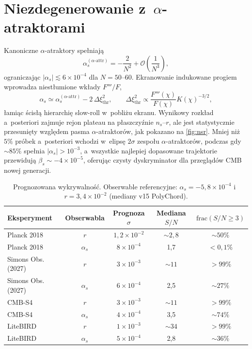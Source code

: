 \documentclass[11pt,a4paper]{article}
\begin{document}
\section{Niezdegenerowanie z~$\alpha$-atraktorami}
\label{sec:nondegeneracy}
Kanoniczne $\alpha$-atraktory spełniają
\begin{equation}
\alpha_{s}^{(\alpha\text{-attr})}=-\frac{2}{N^{2}}+\mathcal{O}\left(\frac{1}{N^{3}}\right),
\end{equation}
ograniczając $|\alpha_{s}|\lesssim6\times10^{-4}$ dla $N=50$--60. Ekranowanie indukowane progiem wprowadza niestłumione wkłady $F'''/F$,
\begin{equation}
\alpha_{s}\simeq \alpha_{s}^{(\alpha\text{-attr})}-2\,\Delta\xi_{\text{thr}}^{2}, \qquad \Delta\xi_{\text{thr}}^{2}\propto\frac{F'''(\chi)}{F(\chi)}K(\chi)^{-3/2},
\end{equation}
łamiąc ścisłą hierarchię slow-roll w~pobliżu ekranu. Wynikowy rozkład a~posteriori zajmuje rejon plateau na płaszczyźnie $n_{s}$--$r$, ale jest statystycznie przesunięty względem pasma $\alpha$-atraktorów, jak pokazano na \cref{fig:nsr}. Mniej niż $5\%$ próbek a~posteriori wchodzi w~elipsę $2\sigma$ zespołu $\alpha$-atraktorów, podczas gdy ${\sim}85\%$ spełnia $|\alpha_{s}|>10^{-3}$, a~wszystkie najlepiej dopasowane trajektorie przewidują $\beta_{s}\sim -4\times10^{-5}$, oferując czysty dyskryminator dla przeglądów CMB nowej generacji.

\begin{table}[t]
    \centering
    \caption{Prognozowana wykrywalność. Obserwable referencyjne: $\alpha_{s}=-5{,}8\times10^{-4}$ i~$r=3{,}4\times10^{-2}$ (mediany v15 PolyChord).}
    \begin{tabular}{lcccc}
        \toprule
        Eksperyment & Obserwabla & Prognoza $\sigma$ & Mediana $S/N$ & $\mathrm{frac}(S/N\ge3)$ \\
        \midrule
        Planck 2018        & $r$          & $1{,}2\times10^{-2}$ & $\sim2{,}8$ & $\sim50\%$ \\
        Planck 2018        & $\alpha_{s}$ & $8\times10^{-4}$     & 1,7         & $<0{,}1\%$ \\
        \midrule
        Simons Obs. (2027) & $r$          & $3\times10^{-3}$     & $\sim11$    & $>99\%$ \\
        Simons Obs. (2027) & $\alpha_{s}$ & $6\times10^{-4}$     & 2,5         & $\sim27\%$ \\
        \midrule
        CMB-S4             & $r$          & $3\times10^{-3}$     & $\sim11$    & $>99\%$ \\
        CMB-S4             & $\alpha_{s}$ & $4\times10^{-4}$     & 3,5         & $\sim74\%$ \\
        \midrule
        LiteBIRD           & $r$          & $1\times10^{-3}$     & $\sim34$    & $>99\%$ \\
        LiteBIRD           & $\alpha_{s}$ & $5\times10^{-4}$     & 2,8         & $\sim36\%$ \\
        \bottomrule
    \end{tabular}
    \label{tab:forecasts}
\end{table}
\end{document}
